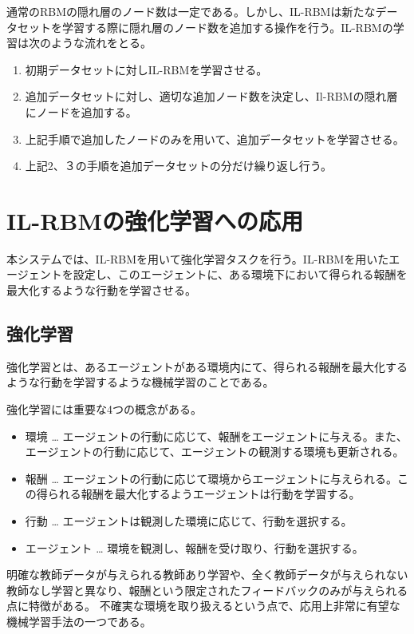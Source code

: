通常のRBMの隠れ層のノード数は一定である。しかし、IL-RBMは新たなデータセットを学習する際に隠れ層のノード数を追加する操作を行う。IL-RBMの学習は次のような流れをとる。

\begin{enumerate}
  \item 初期データセットに対しIL-RBMを学習させる。
  \item 追加データセットに対し、適切な追加ノード数を決定し、Il-RBMの隠れ層にノードを追加する。
  \item 上記手順で追加したノードのみを用いて、追加データセットを学習させる。
  \item 上記2、３の手順を追加データセットの分だけ繰り返し行う。
\end{enumerate}



\section{IL-RBMの強化学習への応用}
本システムでは、IL-RBMを用いて強化学習タスクを行う。IL-RBMを用いたエージェントを設定し、このエージェントに、ある環境下において得られる報酬を最大化するような行動を学習させる。

\subsection{強化学習}
強化学習とは、あるエージェントがある環境内にて、得られる報酬を最大化するような行動を学習するような機械学習のことである。

強化学習には重要な4つの概念がある。

\begin{itemize}
  \item 環境 … エージェントの行動に応じて、報酬をエージェントに与える。また、エージェントの行動に応じて、エージェントの観測する環境も更新される。
  \item 報酬 … エージェントの行動に応じて環境からエージェントに与えられる。この得られる報酬を最大化するようエージェントは行動を学習する。
  \item 行動  … エージェントは観測した環境に応じて、行動を選択する。
  \item エージェント … 環境を観測し、報酬を受け取り、行動を選択する。
\end{itemize}

明確な教師データが与えられる教師あり学習や、全く教師データが与えられない教師なし学習と異なり、報酬という限定されたフィードバックのみが与えられる点に特徴がある。
不確実な環境を取り扱えるという点で、応用上非常に有望な機械学習手法の一つである。


